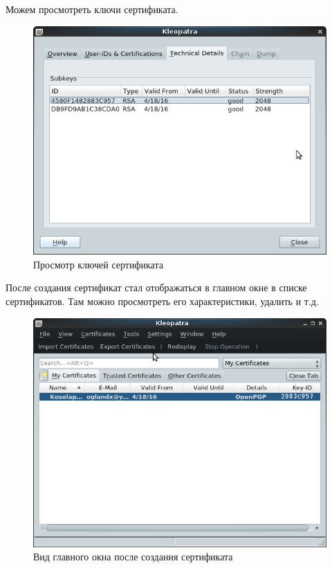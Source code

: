 \documentclass[a4paper]{article}
\begin{document}
Можем просмотреть ключи сертификата.

\begin{figure}[H]
	\begin{center}
		\includegraphics[scale=0.7]{pics/Screenshot at 2016-04-18 00:47:43.png}
		\caption{Просмотр ключей сертификата} 
		\label{pic:pic_name} %
	\end{center}
\end{figure}

После создания сертификат стал отображаться в главном окне в списке сертификатов. Там можно просмотреть его характеристики, удалить и т.д.

\begin{figure}[H]
	\begin{center}
		\includegraphics[scale=0.5]{pics/Screenshot at 2016-04-18 00:52:12.png}
		\caption{Вид главного окна после создания сертификата} 
		\label{pic:pic_name} %
	\end{center}
\end{figure}
\end{document}
